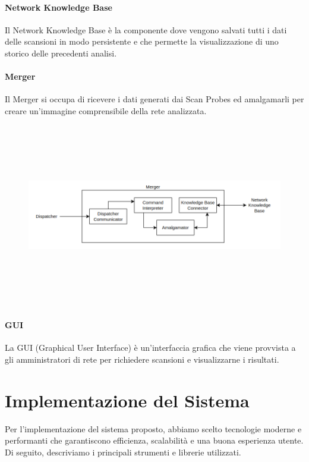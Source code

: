 \documentclass[target=bach,aauheader=,style=]{thud}
\begin{document}
\FloatBarrier


\subsubsection{Network Knowledge Base} 
Il Network Knowledge Base è la componente dove vengono salvati tutti i dati delle scansioni in modo persistente e che permette la visualizzazione di uno storico delle precedenti analisi.

\FloatBarrier

\subsubsection{Merger}
Il Merger si occupa di ricevere i dati generati dai Scan Probes ed amalgamarli per creare un'immagine comprensibile della rete analizzata. 


\begin{figure}[h]
  \includegraphics[width=14cm, height=8cm]{merger}
  \centering
\end{figure}

\FloatBarrier


\subsubsection{GUI} 
La GUI (Graphical User Interface) è un'interfaccia grafica che viene provvista a gli amministratori di rete per richiedere scansioni e visualizzarne i risultati.

\FloatBarrier

\chapter{Implementazione del Sistema}
Per l'implementazione del sistema proposto, abbiamo scelto tecnologie moderne e performanti che garantiscono efficienza, scalabilità e una buona esperienza utente. Di seguito, descriviamo i principali strumenti e librerie utilizzati.
\end{document}
